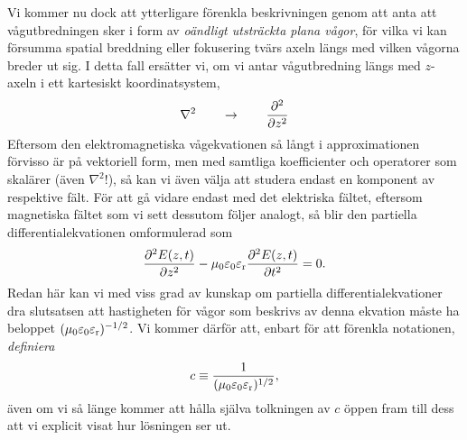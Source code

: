Vi kommer nu dock att ytterligare f{\"o}renkla beskrivningen genom att anta att
v{\aa}gutbredningen sker i form av {\it o{\"a}ndligt utstr{\"a}ckta plana
v{\aa}gor}, f{\"o}r vilka vi kan f{\"o}rsumma spatial breddning eller
fokusering tv{\"a}rs axeln l{\"a}ngs med vilken v{\aa}gorna breder ut sig.
I detta fall ers{\"a}tter vi, om vi antar v{\aa}gutbredning l{\"a}ngs med
$z$-axeln i ett kartesiskt koordinatsystem,
$$
  \nabla^2\qquad\to\qquad{{\partial^2}\over{\partial z^2}}
$$
Eftersom den elektromagnetiska v{\aa}gekvationen s{\aa} l{\aa}ngt i
approximationen f{\"o}rvisso {\"a}r p{\aa} vektoriell form, men med samtliga
koefficienter och operatorer som skal{\"a}rer ({\"a}ven $\nabla^2$!), s{\aa}
kan vi {\"a}ven v{\"a}lja att studera endast en komponent av respektive
f{\"a}lt. F{\"o}r att g{\aa} vidare endast med det elektriska f{\"a}ltet,
eftersom magnetiska f{\"a}ltet som vi sett dessutom f{\"o}ljer analogt, s{\aa}
blir den partiella differentialekvationen omformulerad som
$$
  {{\partial^2 E(z,t)}\over{\partial z^2}}
    -\mu_0\varepsilon_0\varepsilon_{\rm r}
      {{\partial^2 E(z,t)}\over{\partial t^2}} = 0.
$$
Redan h{\"a}r kan vi med viss grad av kunskap om partiella
differentialekvationer dra slutsatsen att hastigheten f{\"o}r v{\aa}gor som
beskrivs av denna ekvation m{\aa}ste ha beloppet
$(\mu_0\varepsilon_0\varepsilon_{\rm r})^{-1/2}$.
Vi kommer d{\"a}rf{\"o}r att, enbart f{\"o}r att f{\"o}renkla notationen,
{\it definiera}
$$
  c \equiv {{1}\over{(\mu_0\varepsilon_0\varepsilon_{\rm r})^{1/2}}},
$$
{\"a}ven om vi s{\aa} l{\"a}nge kommer att h{\aa}lla sj{\"a}lva tolkningen av
$c$ {\"o}ppen fram till dess att vi explicit visat hur l{\"o}sningen ser ut.

